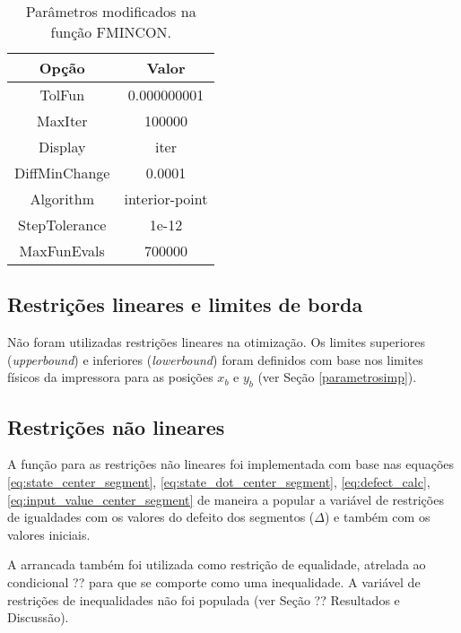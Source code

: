 \begin{table}
    \begin{center}
    \caption{Parâmetros modificados na função FMINCON.}
    \label{tab:fmincon_options}
    \begin{tabular}{c c}
        Opção & Valor \\ \hline
        TolFun & 0.000000001 \\
        MaxIter & 100000 \\
        Display & iter \\
        DiffMinChange & 0.0001 \\
        Algorithm & interior-point \\
        StepTolerance & 1e-12 \\
        MaxFunEvals & 700000  \\ \hline
    \end{tabular}
    \end{center}
\end{table}

\subsection{Restrições lineares e limites de borda}

Não foram utilizadas restrições lineares na otimização. Os limites superiores (\textit{upperbound}) e inferiores (\textit{lowerbound}) foram definidos com base nos limites físicos da impressora para as posições $x_b$ e $y_b$ (ver Seção \ref{parametrosimp}).

\subsection{Restrições não lineares}

A função para as restrições não lineares foi implementada com base nas equações \ref{eq:state_center_segment}, \ref{eq:state_dot_center_segment}, \ref{eq:defect_calc}, \ref{eq:input_value_center_segment} de maneira a popular a variável de restrições de igualdades com os valores do defeito dos segmentos ($\Delta$) e também com os valores iniciais. 

A arrancada também foi utilizada como restrição de equalidade, atrelada ao condicional ?? para que se comporte como uma inequalidade. A variável de restrições de inequalidades não foi populada (ver Seção ?? Resultados e Discussão).


